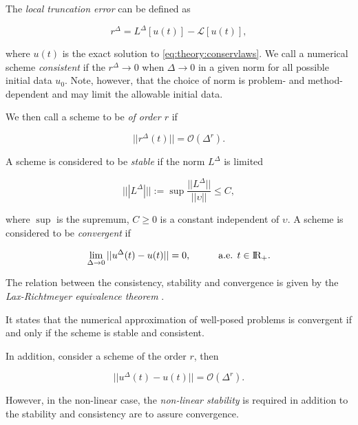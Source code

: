 The \textit{ local truncation error } can be defined as 

\begin{equation}
r^{\Delta} = L^{\Delta}[u(t)] - \mathcal{L}[u(t)],
\end{equation}

where $u(t)$ is the exact solution to \ref{eq:theory:conservlaws}. 
We call a numerical scheme \textit{consistent} if the $r^{\Delta}\rightarrow 0$ when $\Delta\rightarrow 0$ in a given norm for all possible initial data $u_0$. 
Note, however, that the choice of norm is problem- and method- dependent and may limit the allowable initial data. 

We then call a scheme to be \textit{ of order $r$ } if 

\begin{equation}
|| r^{\Delta}(t) || = \mathcal{O}(\Delta^r).
\end{equation}

A scheme is considered to be \textit{stable} if the norm $L^{\Delta}$ is limited 

\begin{equation}
|||L^{\Delta}||| := \sup \frac{||L^{\Delta}||}{||\upsilon||}\leq C,
\end{equation}

where $\sup$ is the supremum, $C\geq 0$ is a constant independent of $\upsilon$. 
A scheme is considered to be \textit{convergent} if 

\begin{equation}
\lim_{\Delta\rightarrow 0} ||u^{\Delta}(t)-u(t)|| = 0, \hspace{10mm} \text{a.e. } t\in \text{I\!R}_{+}.
\end{equation}

The relation between the consistency, stability and convergence is given by the 
\textit{Lax-Richtmeyer equivalence theorem} \cite{Lax:1956}. 

It states that the numerical approximation of well-posed problems is convergent if and only if the scheme is stable and consistent. 

In addition, consider a scheme of the order $r$, then

\begin{equation}
|| u^{\Delta}(t) - u(t) || = \mathcal{O}(\Delta^r).
\end{equation}

However, in the non-linear case, the \textit{non-linear stability} is required in addition to the stability and consistency are to assure convergence. 



